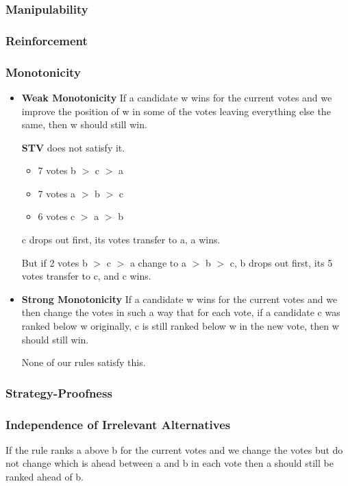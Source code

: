 	\subsubsection{Manipulability}

	\subsubsection{Reinforcement}
	
	\subsubsection{Monotonicity}
	\begin{itemize}
		\item[] \textbf{Weak Monotonicity}
		If a candidate w wins for the current votes and we improve the position of w in some of the votes leaving everything else the same, then w should still win.
		
		\begin{example} \textbf{STV} does not satisfy it.
			\begin{itemize}
				\item[] 7 votes b $>$ c $>$ a
				\item[] 7 votes a $>$ b $>$ c
				\item[] 6 votes c $>$ a $>$ b
			\end{itemize}
			c drops out first, its votes transfer to a, a wins.
			
			But if 2 votes b $>$ c $>$ a change to a $>$ b $>$ c, b drops out first, its 5 votes transfer to c, and c wins.
		\end{example}
		\item[] \textbf{Strong Monotonicity}
		If a candidate w wins for the current votes and we then change the votes in such a way that for each vote, if a
		candidate c was ranked below w originally, c is still ranked below w in the new vote, then w should still win.
		
		None of our rules satisfy this.
	\end{itemize}

	\subsubsection{Strategy-Proofness}
	
	\subsubsection{Independence of Irrelevant Alternatives}
	If the rule ranks a above b for the current votes and we change the votes but do not change which is ahead between a and b in each vote then a should still be ranked ahead of b.
	
